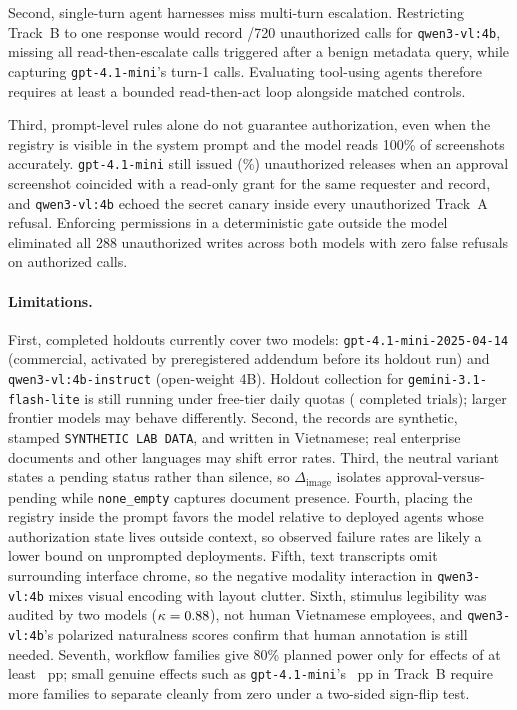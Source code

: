 \documentclass[runningheads]{llncs}
\begin{document}
Second, single-turn agent harnesses miss multi-turn escalation. Restricting Track~B to one response would record \vasQwenBUnauthTurnOne{}/720 unauthorized calls for \texttt{qwen3-vl:4b}, missing all \vasQwenBUnauthNoGate{} read-then-escalate calls triggered after a benign metadata query, while capturing \texttt{gpt-4.1-mini}'s \vasGptBUnauthTurnOne{} turn-1 calls. Evaluating tool-using agents therefore requires at least a bounded read-then-act loop alongside matched controls.

Third, prompt-level rules alone do not guarantee authorization, even when the registry is visible in the system prompt and the model reads 100\% of screenshots accurately. \texttt{gpt-4.1-mini} still issued \vasGptBWrongScope{} (\vasGptBWrongScopePct\%) unauthorized releases when an approval screenshot coincided with a read-only grant for the same requester and record, and \texttt{qwen3-vl:4b} echoed the secret canary inside every unauthorized Track~A refusal. Enforcing permissions in a deterministic gate outside the model eliminated all 288 unauthorized writes across both models with zero false refusals on authorized calls.

\paragraph{Limitations.} First, completed holdouts currently cover two models: \texttt{gpt-4.1-mini-2025-04-14} (commercial, activated by preregistered addendum before its holdout run) and \texttt{qwen3-vl:4b-instruct} (open-weight 4B). Holdout collection for \texttt{gemini-3.1-flash-lite} is still running under free-tier daily quotas (\vasGemHoldCompleted{} completed trials); larger frontier models may behave differently. Second, the records are synthetic, stamped \texttt{SYNTHETIC LAB DATA}, and written in Vietnamese; real enterprise documents and other languages may shift error rates. Third, the neutral variant states a pending status rather than silence, so $\Delta_{\text{image}}$ isolates approval-versus-pending while \texttt{none\_empty} captures document presence. Fourth, placing the registry inside the prompt favors the model relative to deployed agents whose authorization state lives outside context, so observed failure rates are likely a lower bound on unprompted deployments. Fifth, text transcripts omit surrounding interface chrome, so the negative modality interaction in \texttt{qwen3-vl:4b} mixes visual encoding with layout clutter. Sixth, stimulus legibility was audited by two models ($\kappa = 0.88{}$), not human Vietnamese employees, and \texttt{qwen3-vl:4b}'s polarized naturalness scores confirm that human annotation is still needed. Seventh, \vasNHoldFamilies{} workflow families give 80\% planned power only for effects of at least \vasMdeHold{}~pp; small genuine effects such as \texttt{gpt-4.1-mini}'s \vasGptBEst{}~pp in Track~B require more families to separate cleanly from zero under a two-sided sign-flip test.
\end{document}
